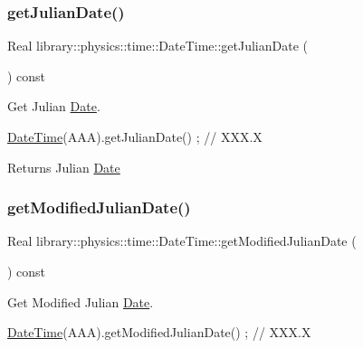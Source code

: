 \subsubsection{\texorpdfstring{get\+Julian\+Date()}{getJulianDate()}}
{\footnotesize\ttfamily Real library\+::physics\+::time\+::\+Date\+Time\+::get\+Julian\+Date (\begin{DoxyParamCaption}{ }\end{DoxyParamCaption}) const}



Get Julian \hyperlink{classlibrary_1_1physics_1_1time_1_1_date}{Date}. 


\begin{DoxyCode}
\hyperlink{classlibrary_1_1physics_1_1time_1_1_date_time_a4ea629e533f335c928e037c4ead4646e}{DateTime}(AAA).getJulianDate() ; \textcolor{comment}{// XXX.X}
\end{DoxyCode}


\begin{DoxyReturn}{Returns}
Julian \hyperlink{classlibrary_1_1physics_1_1time_1_1_date}{Date} 
\end{DoxyReturn}
\mbox{\label{classlibrary_1_1physics_1_1time_1_1_date_time_a9c624dbbdd13c81d96f0492eae0d1e2f}} 
\subsubsection{\texorpdfstring{get\+Modified\+Julian\+Date()}{getModifiedJulianDate()}}
{\footnotesize\ttfamily Real library\+::physics\+::time\+::\+Date\+Time\+::get\+Modified\+Julian\+Date (\begin{DoxyParamCaption}{ }\end{DoxyParamCaption}) const}



Get Modified Julian \hyperlink{classlibrary_1_1physics_1_1time_1_1_date}{Date}. 


\begin{DoxyCode}
\hyperlink{classlibrary_1_1physics_1_1time_1_1_date_time_a4ea629e533f335c928e037c4ead4646e}{DateTime}(AAA).getModifiedJulianDate() ; \textcolor{comment}{// XXX.X}
\end{DoxyCode}


